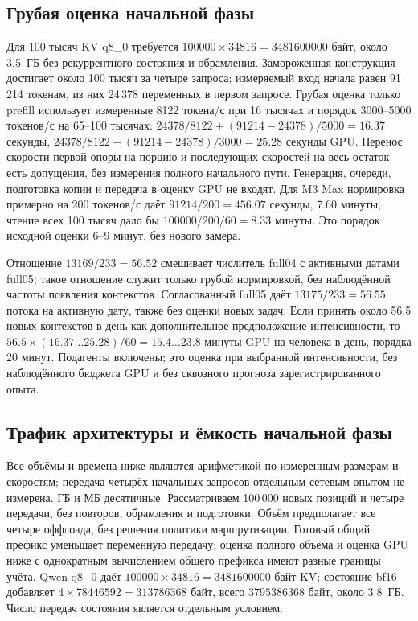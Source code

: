 \subsection{Грубая оценка начальной фазы}
\label{app:start-budget}
Для 100 тысяч KV q8\_0 требуется $100000\times34816=3481600000$ байт,
около 3.5~ГБ без рекуррентного состояния и обрамления.
Замороженная конструкция достигает около 100 тысяч за четыре запроса;
измеряемый вход начала равен 91\,214 токенам, из них 24\,378 переменных в первом запросе.
Грубая оценка только prefill использует измеренные 8122 токена/с при 16 тысячах
и порядок 3000--5000 токенов/с на 65--100 тысячах:
$24378/8122+(91214-24378)/5000=16.37$ секунды,
$24378/8122+(91214-24378)/3000=25.28$ секунды GPU.
Перенос скорости первой опоры на порцию и последующих скоростей на весь остаток есть допущения,
без измерения полного начального пути. Генерация, очереди, подготовка копии и передача в оценку GPU не входят.
Для M3 Max нормировка примерно на 200 токенов/с даёт $91214/200=456.07$ секунды,
7.60 минуты; чтение всех 100 тысяч дало бы $100000/200/60=8.33$ минуты.
Это порядок исходной оценки 6--9 минут, без нового замера.

Отношение $13169/233=56.52$ смешивает числитель full04 с активными датами full05;
такое отношение служит только грубой нормировкой, без наблюдённой частоты появления контекстов.
Согласованный full05 даёт $13175/233=56.55$ потока на активную дату, также без оценки новых задач.
Если принять около 56.5 новых контекстов в день как дополнительное предположение интенсивности,
то $56.5\times(16.37\ldots25.28)/60=15.4\ldots23.8$ минуты GPU на человека в день,
порядка 20 минут. Подагенты включены; это оценка при выбранной интенсивности,
без наблюдённого бюджета GPU и без сквозного прогноза зарегистрированного опыта.


\subsection{Трафик архитектуры и ёмкость начальной фазы}
\label{app:architecture-traffic}
Все объёмы и времена ниже являются арифметикой по измеренным размерам и скоростям;
передача четырёх начальных запросов отдельным сетевым опытом не измерена. ГБ и МБ десятичные.
Рассматриваем 100\,000 новых позиций и четыре передачи, без повторов, обрамления и подготовки.
Объём предполагает все четыре оффлоада, без решения политики маршрутизации.
Готовый общий префикс уменьшает переменную передачу; оценка полного объёма и оценка GPU ниже
с однократным вычислением общего префикса имеют разные границы учёта.
Qwen q8\_0 даёт $100000\times34816=3481600000$ байт KV;
состояние bf16 добавляет $4\times78446592=313786368$ байт,
всего $3795386368$ байт, около 3.8~ГБ. Число передач состояния является отдельным условием.

